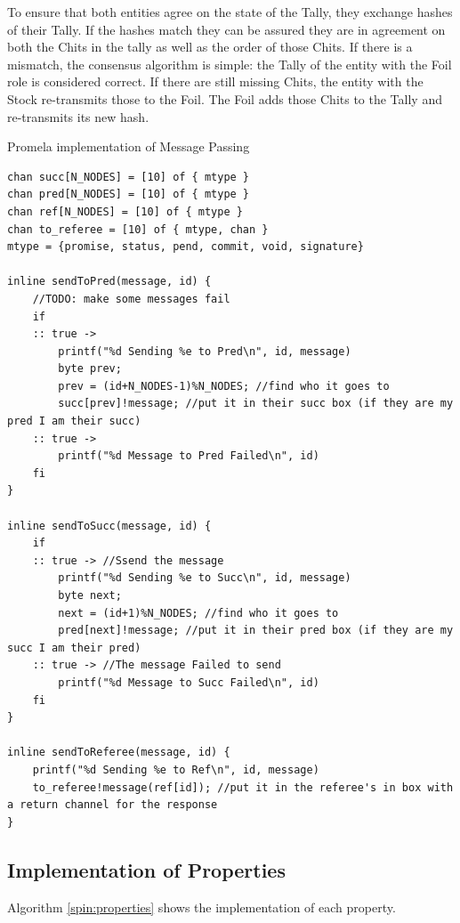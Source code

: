 \documentclass[runningheads]{llncs}
\begin{document}
To ensure that both entities agree on the state of the Tally, they exchange hashes of their Tally. If the hashes match they can be assured they are in agreement on both the Chits in the tally as well as the order of those Chits. If there is a mismatch, the consensus algorithm is simple: the Tally of the entity with the Foil role is considered correct. If there are still missing Chits, the entity with the Stock re-transmits those to the Foil. The Foil adds those Chits to the Tally and re-transmits its new hash. 

\begin{algorithm}
\caption{Promela implementation of Message Passing} \label{spin:messages}
\begin{verbatim}
chan succ[N_NODES] = [10] of { mtype }
chan pred[N_NODES] = [10] of { mtype }
chan ref[N_NODES] = [10] of { mtype }
chan to_referee = [10] of { mtype, chan }
mtype = {promise, status, pend, commit, void, signature}

inline sendToPred(message, id) {
    //TODO: make some messages fail
    if
    :: true ->
        printf("%d Sending %e to Pred\n", id, message)
        byte prev;
        prev = (id+N_NODES-1)%N_NODES; //find who it goes to
        succ[prev]!message; //put it in their succ box (if they are my pred I am their succ)
    :: true ->
        printf("%d Message to Pred Failed\n", id)
    fi
}

inline sendToSucc(message, id) {
    if
    :: true -> //Ssend the message
        printf("%d Sending %e to Succ\n", id, message)
        byte next;
        next = (id+1)%N_NODES; //find who it goes to
        pred[next]!message; //put it in their pred box (if they are my succ I am their pred)
    :: true -> //The message Failed to send
        printf("%d Message to Succ Failed\n", id)
    fi
}

inline sendToReferee(message, id) {
    printf("%d Sending %e to Ref\n", id, message)
    to_referee!message(ref[id]); //put it in the referee's in box with a return channel for the response
}
\end{verbatim}
\end{algorithm}

\subsection{Implementation of Properties}
Algorithm \ref{spin:properties} shows the implementation of each property.
\end{document}
